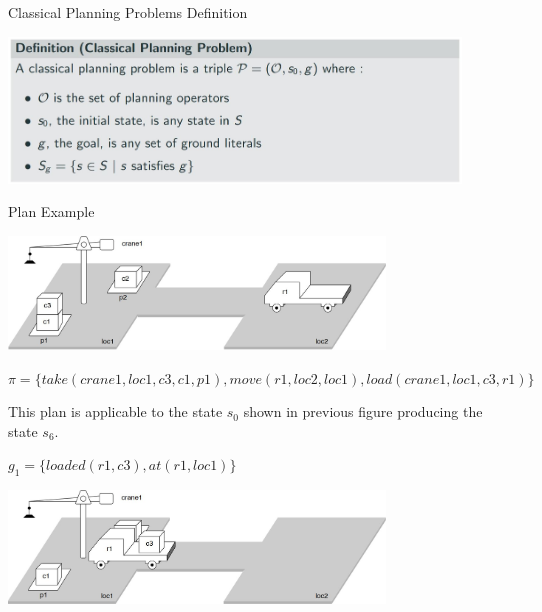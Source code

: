 \documentclass[9pt]{beamer}
\begin{document}
\begin{frame}{Classical Planning Problems Definition}
\begin{small}

\begin{center}
\includegraphics[keepaspectratio, width=0.90\textwidth]{images/automated_planning_classical2_def.jpg}
\end{center}

\end{small}
\end{frame}

\begin{frame}{Plan Example}
\begin{small}

\begin{center}
\includegraphics[keepaspectratio, width=0.75\textwidth]{images/automated_planning_example2.jpg}
\end{center}

$\pi = \{take(crane1,loc1,c3,c1,p1), move(r1,loc2,loc1), load(crane1,loc1,c3,r1)\}$

This plan is applicable to the state $s_0$ shown in previous figure producing the state $s_6$.

$g_1 = \{loaded(r1,c3), at(r1,loc1)\}$

\begin{center}
\includegraphics[keepaspectratio, width=0.75\textwidth]{images/automated_planning_example4.jpg}
\end{center}
\end{small}
\end{frame}
\end{document}
